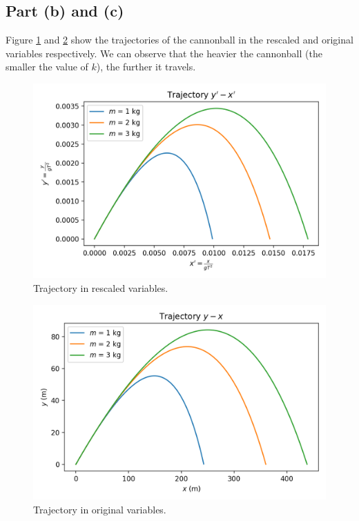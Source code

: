 \documentclass[11pt]{article}
\begin{document}
\subsection{Part (b) and (c)}
Figure \ref{fig:y-x} and \ref{fig:yp-xp} show the trajectories of the cannonball in the rescaled and original variables respectively. We can observe that the heavier the cannonball (the smaller the value of $k$), the further it travels.
\begin{figure}[H]
    \centering
    \includegraphics[scale = 0.7]{Figs/ps-9-2.png}
    \caption{Trajectory in rescaled variables.}
    \label{fig:y-x}
\end{figure}
\begin{figure}[H]
    \centering
    \includegraphics[scale = 0.7]{Figs/ps-9-2unit.png}
    \caption{Trajectory in original variables.}
    \label{fig:yp-xp}
\end{figure}
\end{document}
